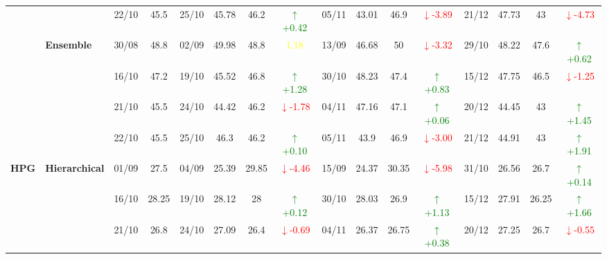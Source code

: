 \documentclass{ieeeaccess}
\begin{document}
{\begin{longtable}{llcc|cccc|cccc|cccc}
&
& 22/10 & 45.5 & 25/10 & 45.78 & 46.2 & \textcolor{green}{\(\uparrow\)+0.42} & 05/11 & 43.01 & 46.9 & \textcolor{red}{\(\downarrow\)-3.89} & 21/12 & 47.73 & 43 & \textcolor{red}{\(\downarrow\)-4.73} \\
\cmidrule(lr){2-16}



& \textbf{Ensemble}
& 30/08 & 48.8 & 02/09 & 49.98 & 48.8 & \textcolor{yellow}{1.18} & 13/09 & 46.68 & 50 & \textcolor{red}{\(\downarrow\)-3.32} & 29/10 & 48.22 & 47.6 & \textcolor{green}{\(\uparrow\)+0.62} \\

&
& 16/10 & 47.2 & 19/10 & 45.52 & 46.8 & \textcolor{green}{\(\uparrow\)+1.28} & 30/10 & 48.23 & 47.4 & \textcolor{green}{\(\uparrow\)+0.83} & 15/12 & 47.75 & 46.5 & \textcolor{red}{\(\downarrow\)-1.25} \\

&
& 21/10 & 45.5 & 24/10 & 44.42 & 46.2 & \textcolor{red}{\(\downarrow\)-1.78} & 04/11 & 47.16 & 47.1 & \textcolor{green}{\(\uparrow\)+0.06} & 20/12 & 44.45 & 43 & \textcolor{green}{\(\uparrow\)+1.45} \\

&
& 22/10 & 45.5 & 25/10 & 46.3 & 46.2 & \textcolor{green}{\(\uparrow\)+0.10} & 05/11 & 43.9 & 46.9 & \textcolor{red}{\(\downarrow\)-3.00} & 21/12 & 44.91 & 43 & \textcolor{green}{\(\uparrow\)+1.91} \\
\midrule


\multirow{12}{*}{\textbf{HPG}} 
& \textbf{Hierarchical}
& 01/09 & 27.5 & 04/09 & 25.39 & 29.85 & \textcolor{red}{\(\downarrow\)-4.46} & 15/09 & 24.37 & 30.35 & \textcolor{red}{\(\downarrow\)-5.98} & 31/10 & 26.56 & 26.7 & \textcolor{green}{\(\uparrow\)+0.14} \\

& 
& 16/10 & 28.25 & 19/10 & 28.12 & 28 & \textcolor{green}{\(\uparrow\)+0.12} & 30/10 & 28.03 & 26.9 & \textcolor{green}{\(\uparrow\)+1.13} & 15/12 & 27.91 & 26.25 & \textcolor{green}{\(\uparrow\)+1.66} \\

& 
& 21/10 & 26.8 & 24/10 & 27.09 & 26.4 & \textcolor{red}{\(\downarrow\)-0.69} & 04/11 & 26.37 & 26.75 & \textcolor{green}{\(\uparrow\)+0.38} & 20/12 & 27.25 & 26.7 & \textcolor{red}{\(\downarrow\)-0.55} \\


\end{longtable}}
\end{document}
